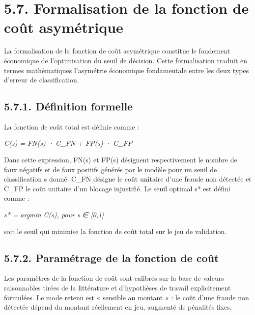 \section{5.7. Formalisation de la fonction de coût asymétrique}

La formalisation de la fonction de coût asymétrique constitue le fondement économique de l'optimisation du seuil de décision. Cette formalisation traduit en termes mathématiques l'asymétrie économique fondamentale entre les deux types d'erreur de classification.

\subsection{5.7.1. Définition formelle}

La fonction de coût total est définie comme :

\emph{C(s) = FN(}\emph{s) ·}\emph{ C\_FN + FP(}\emph{s) ·}\emph{ C\_FP}

Dans cette expression, FN(s) et FP(s) désignent respectivement le nombre de faux négatifs et de faux positifs générés par le modèle pour un seuil de classification s donné. C\_FN désigne le coût unitaire d'une fraude non détectée et C\_FP le coût unitaire d'un blocage injustifié. Le seuil optimal s* est défini comme :

\emph{s}\emph{* = }\emph{argmin}\emph{ C(s), pour s }\emph{∈}\emph{ [0,1]}

soit le seuil qui minimise la fonction de coût total sur le jeu de validation.

\subsection{5.7.2. Paramétrage de la fonction de coût}

Les paramètres de la fonction de coût sont calibrés sur la base de valeurs raisonnables tirées de la littérature et d'hypothèses de travail explicitement formulées. Le mode retenu est « sensible au montant » : le coût d'une fraude non détectée dépend du montant réellement en jeu, augmenté de pénalités fixes.

